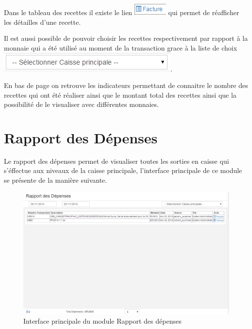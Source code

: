 \documentclass[12pt,a4paper]{report}
\begin{document}
Dans le tableau des recettes il existe le lien \includegraphics[scale=0.7]{pic/FactureRePrint.png} qui permet de réafficher les détailles d'une recette.

Il est aussi possible de pouvoir choisir les recettes respectivement par rapport à la monnaie qui a été utilisé au moment de la transaction grace à la liste de choix \includegraphics[scale=0.7]{pic/SelecPriCash.png}.

En bas de page on retrouve les indicateurs permettant de connaitre le nombre des recettes qui ont été réaliser ainsi que le montant total des recettes ainsi que la possibilité de le visualiser avec différentes monnaies. 

\newpage
\section{Rapport des Dépenses}
Le rapport des dépenses permet de visualiser toutes les sorties en caisse qui s'éffectue aux niveaux de la caisse principale, l'interface principale de ce module se présente de la manière suivante.

\begin{figure}[h]
\begin{center}
\includegraphics[width=14cm]{pic/RapDepenses.png}
\end{center}
\caption{Interface principale du module Rapport des dépenses}
\label{Interface principale du module Rapport des dépenses}
\end{figure}
\end{document}
